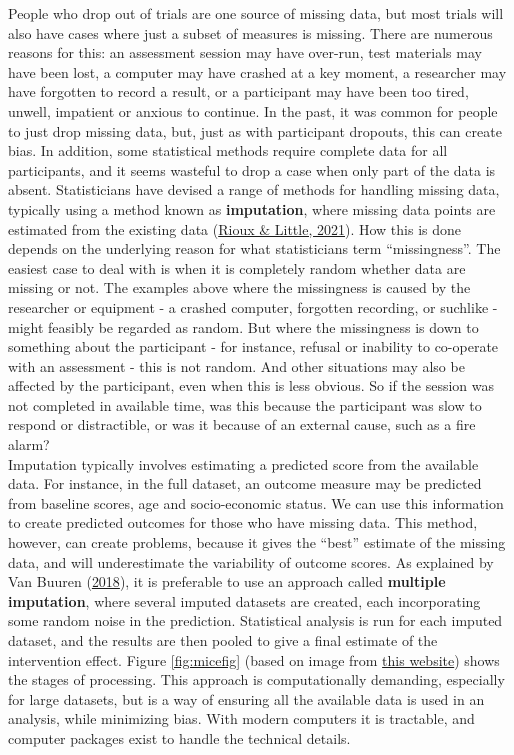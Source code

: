 \documentclass{krantz}
\begin{document}
People who drop out of trials are one source of missing data, but most trials will also have cases where just a subset of measures is missing. There are numerous reasons for this: an assessment session may have over-run, test materials may have been lost, a computer may have crashed at a key moment, a researcher may have forgotten to record a result, or a participant may have been too tired, unwell, impatient or anxious to continue. In the past, it was common for people to just drop missing data, but, just as with participant dropouts, this can create bias. In addition, some statistical methods require complete data for all participants, and it seems wasteful to drop a case when only part of the data is absent. Statisticians have devised a range of methods for handling missing data, typically using a method known as \textbf{imputation}, where missing data points are estimated from the existing data (\protect\hyperlink{ref-rioux2021}{Rioux \& Little, 2021}). How this is done depends on the underlying reason for what statisticians term ``missingness''. The easiest case to deal with is when it is completely random whether data are missing or not. The examples above where the missingness is caused by the researcher or equipment - a crashed computer, forgotten recording, or suchlike - might feasibly be regarded as random. But where the missingness is down to something about the participant - for instance, refusal or inability to co-operate with an assessment - this is not random. And other situations may also be affected by the participant, even when this is less obvious. So if the session was not completed in available time, was this because the participant was slow to respond or distractible, or was it because of an external cause, such as a fire alarm?\\
Imputation typically involves estimating a predicted score from the available data. For instance, in the full dataset, an outcome measure may be predicted from baseline scores, age and socio-economic status. We can use this information to create predicted outcomes for those who have missing data. This method, however, can create problems, because it gives the ``best'' estimate of the missing data, and will underestimate the variability of outcome scores. As explained by Van Buuren (\protect\hyperlink{ref-vanbuuren2018}{2018}), it is preferable to use an approach called \textbf{multiple imputation}, where several imputed datasets are created, each incorporating some random noise in the prediction. Statistical analysis is run for each imputed dataset, and the results are then pooled to give a final estimate of the intervention effect. Figure \ref{fig:micefig} (based on image from \href{https://data.library.virginia.edu/getting-started-with-multiple-imputation-in-r/}{this website}) shows the stages of processing. This approach is computationally demanding, especially for large datasets, but is a way of ensuring all the available data is used in an analysis, while minimizing bias. With modern computers it is tractable, and computer packages exist to handle the technical details.
\end{document}
